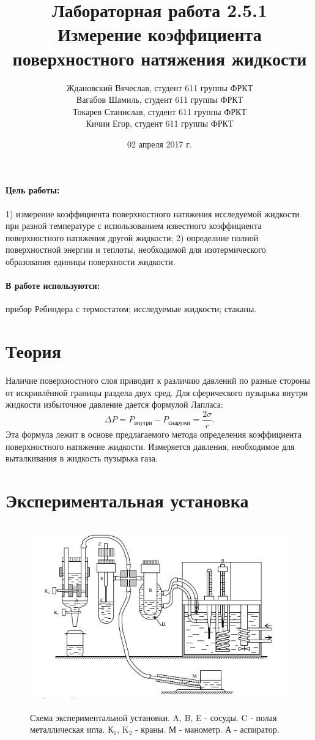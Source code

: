 \documentclass[a4paper]{article}
\title{Лабораторная работа 2.5.1 \\Измерение коэффициента поверхностного натяжения жидкости}
\date{02 апреля 2017 г.}
\author{Ждановский Вячеслав, студент 611 группы ФРКТ\\
Вагабов Шамиль, студент 611 группы ФРКТ\\
Токарев Станислав, студент 611 группы ФРКТ\\
Кичин Егор, студент 611 группы ФРКТ}
\begin{document}
	
	\maketitle
	\newpage
	
	\paragraph{Цель работы:} 1) измерение коэффициента поверхностного натяжения исследуемой жидкости при разной температуре с использованием известного коэффициента поверхностного натяжения другой жидкости; 2) определние полной поверхностной энергии и теплоты, необходимой для изотермического образования единицы поверхности жидкости.
	\paragraph{В работе используются:}прибор Ребиндера с термостатом; исследуемые жидкости; стаканы.
	\section{Теория}
	Наличие поверхностного слоя приводит к различию давлений по разные стороны от искривлённой границы раздела двух сред. Для сферического пузырька внутри жидкости избыточное давление дается формулой Лапласа:
	\begin{equation}
	\Delta P = P_\text{внутри} - P_\text{снаружи}=\frac{2\sigma}{r}.
	\end{equation}
	Эта формула лежит в основе предлагаемого метода определения коэффициента поверхностного натяжение жидкости. Измеряется давления, необходимое для выталкивания в жидкость пузырька газа.
	\section{Экспериментальная установка}
	\begin{figure}[ht!]
		\centering
		\includegraphics[height=80mm]{pic1.png}
		\caption{Схема экспериментальной установки. A, B, E - сосуды. C - полая металлическая игла. К$_1$, K$_2$ - краны. М - манометр. А - аспиратор. \label{overflow}}
	\end{figure}
\end{document}
